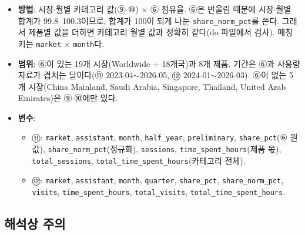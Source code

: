 \documentclass[11pt]{article}
\begin{document}
\begin{itemize}
  \item \textbf{방법}: 시장$\cdot$월별 카테고리 값(⑨$\cdot$⑩) $\times$ ⑥ 점유율. ⑥은 반올림 때문에 시장$\cdot$월별 합계가 99.8--100.3이므로, 합계가 100이 되게 나눈 \texttt{share\_norm\_pct}를 쓴다. 그래서 제품별 값을 더하면 카테고리 월별 값과 정확히 같다(do 파일에서 검사). 매칭 키는 \texttt{market} $\times$ \texttt{month}다.
  \item \textbf{범위}: ⑥이 있는 19개 시장(Worldwide + 18개국)과 8개 제품. 기간은 ⑥과 사용량 자료가 겹치는 달이다(⑪ 2023-04$\sim$2026-05, ⑫ 2024-01$\sim$2026-03). ⑥이 없는 5개 시장(China Mainland, Saudi Arabia, Singapore, Thailand, United Arab Emirates)은 ⑨$\cdot$⑩에만 있다.
  \item \textbf{변수}:
  \begin{itemize}
    \item ⑪: \texttt{market}, \texttt{assistant}, \texttt{month}, \texttt{half\_year}, \texttt{preliminary}, \texttt{share\_pct}(⑥ 원 값), \texttt{share\_norm\_pct}(정규화), \texttt{sessions}, \texttt{time\_spent\_hours}(제품 몫), \texttt{total\_sessions}, \texttt{total\_time\_spent\_hours}(카테고리 전체).
    \item ⑫: \texttt{market}, \texttt{assistant}, \texttt{month}, \texttt{quarter}, \texttt{share\_pct}, \texttt{share\_norm\_pct}, \texttt{visits}, \texttt{time\_spent\_hours}, \texttt{total\_visits}, \texttt{total\_time\_spent\_hours}.
  \end{itemize}
\end{itemize}

\subsection{해석상 주의}
\end{document}
